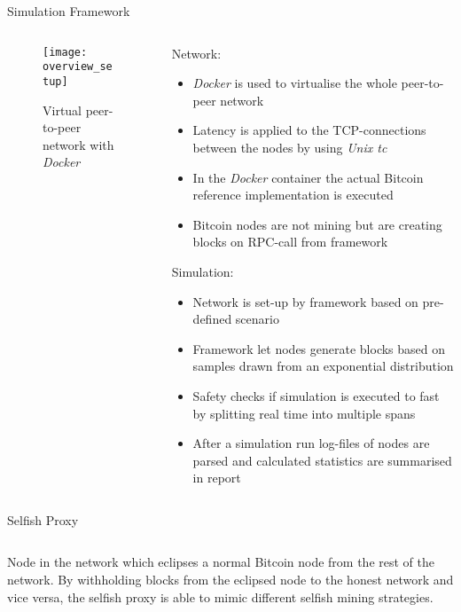 \documentclass[final,hyperref={pdfpagelabels=true}]{beamer}
\begin{document}
\begin{frame}
  \begin{block}{Simulation Framework}
  \begin{columns}[t]

    \begin{column}{.3\textwidth}
		
		\begin{figure}[t]
			\texttt{[image: overview\_setup]}
			\centering
			\caption{Virtual peer-to-peer network with \textit{Docker}}
		\end{figure}      	
      
    \end{column}

    \begin{column}{.6\textwidth}
    	Network:
     	\begin{itemize}
     		\item \textit{Docker} is used to virtualise the whole peer-to-peer network
     		\item Latency is applied to the TCP-connections between the nodes by using \textit{Unix tc}
     		\item In the \textit{Docker} container the actual Bitcoin reference implementation is executed
     		\item Bitcoin nodes are not mining but are creating blocks on RPC-call from framework
     	\end{itemize}
     	Simulation:
       	\begin{itemize}
     		\item Network is set-up by framework based on pre-defined scenario
     		\item Framework let nodes generate blocks based on samples drawn from an exponential distribution
     		\item Safety checks if simulation is executed to fast by splitting real time into multiple spans
     		\item After a simulation run log-files of nodes are parsed and calculated statistics are summarised in report 	\end{itemize}
    \end{column}

  \end{columns}
  \end{block}
  
  \begin{block}{Selfish Proxy}
  	\begin{columns}[t]
     	\begin{column}{.45\textwidth}
     		Node in the network which eclipses a normal Bitcoin node from the rest of the network. By withholding blocks from the eclipsed node to the honest network and vice versa, the selfish proxy is able to mimic different selfish mining strategies.
     		

\end{column}
\end{columns}
\end{block}
\end{frame}
\end{document}
